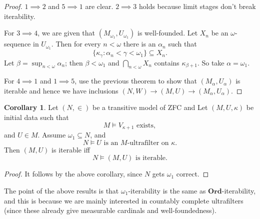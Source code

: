\documentclass[12pt]{report}
\newcommand{\Ord}{\mathbf{Ord}}
\theoremstyle{definition}
\newtheorem{corollary}[theorem]{Corollary}
\begin{document}
\begin{proof}
$1 \implies 2$ and $5 \implies 1$ are clear. $2 \implies 3$ holds because limit stages don't break iterability.

For $3 \implies 4$, we are given that $(M_{\omega_1}, U_{\omega_1})$ is well-founded. Let $X_n$ be an $\omega$-sequence in $U_{\omega_1}$. Then for every $n < \omega$ there is an $\alpha_n$ such that
$$\{\kappa_\gamma: \alpha_n < \gamma < \omega_1\} \subseteq X_n.$$
Let $\beta = \sup_{n < \omega} \alpha_n$; then $\beta < \omega_1$ and $\bigcap_{n < \omega} X_n$ contains $\kappa_{\beta + 1}$.
So take $\alpha = \omega_1$.

For $4 \implies 1$ and $1 \implies 5$, use the previous theorem to show that $(M_\alpha, U_\alpha)$ is iterable and hence we have inclusions $(N, W) \to (M, U) \to (M_\alpha, U_\alpha)$.
\end{proof}
\begin{corollary}
Let $(N, \in)$ be a transitive model of ZFC and Let $(M, U, \kappa)$ be initial data such that
$$M \models \text{$V_{\kappa + 1}$ exists},$$
and $U \in M$. Assume $\omega_1 \subseteq N$, and
$$N \models \text{$U$ is an $M$-ultrafilter on $\kappa$.}$$
Then $(M, U)$ is iterable iff
$$N \models \text{$(M, U)$ is iterable.}$$
\end{corollary}
\begin{proof}
It follows by the above corollary, since $N$ gets $\omega_1$ correct.
\end{proof}
The point of the above results is that $\omega_1$-iterability is the same as $\Ord$-iterability, and this is because we are mainly interested in countably complete ultrafilters (since these already give measurable cardinals and well-foundedness).
\end{document}

